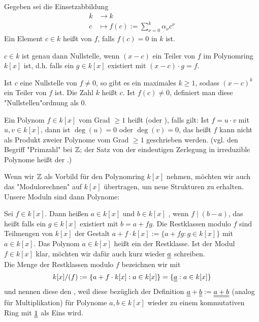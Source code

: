 \begin{defn}[Nullstelle]
	Gegeben sei die Einsetzabbildung
	\begin{equation}
	\begin{aligned}
		k &\longrightarrow k \\
		c &\longmapsto f(c) := \sum_{\nu = 0}^{k} \alpha_\nu c^\nu
	\end{aligned}
	\end{equation}
	Ein Element $c \in k$ heißt  von $f$, falls $f(c) = 0$ in $k$ ist.
\end{defn}

\begin{bem}
	$c \in k$ ist genau dann Nullstelle, wenn $(x-c)$ ein Teiler von $f$ im Polynomring $k[x]$ ist, d.h. falls ein $g \in k[x]$ existiert mit $(x-c) \cdot g = f$.
\end{bem}

\begin{defn}
	Ist $c$ eine Nullstelle von $f \neq 0$, so gibt es ein maximales $k \geq 1$, sodass $(x-c)^k$ ein Teiler von $f$ ist. Die Zahl $k$ heißt  $c$. Ist $f(c) \neq 0$, definiert man diese "Nullstellen"ordnung als $0$. 
\end{defn}

\begin{defn}
	Ein Polynom $f \in k[x]$ vom Grad $\geq 1$ heißt  (oder ), falls gilt: Ist $f = u \cdot v$ mit $u,v \in k[x]$, dann ist $\deg(u) = 0$ oder $\deg(v) = 0$, das heißt $f$ kann nicht als Produkt zweier Polynome vom Grad $\geq 1$ geschrieben werden. (vgl. den Begriff "Primzahl" bei $\mathbb{Z}$; der Satz von der eindeutigen Zerlegung in irreduzible Polynome heißt der .)
\end{defn}

Wenn wir $\mathbb{Z}$ als Vorbild für den Polynomring $k[x]$ nehmen, möchten wir auch das "Modulorechnen" auf $k[x]$ übertragen, um neue Strukturen zu erhalten. Unsere Moduln sind dann Polynome:
\begin{defn}
	Sei $f \in k[x]$. Dann heißen $a \in k[x]$ und $b \in k[x]$ , wenn $f \mid (b-a)$, das heißt falls ein $g \in k[x]$ existiert mit $b = a + fg$. Die Restklassen modulo $f$ sind Teilmengen von $k[x]$ der Gestalt $a + f \cdot k[x] := \{a + fg : g \in k[x]\}$ mit $a \in k[x]$. Das Polynom $a \in k[x]$ heißt ein  der Restklasse. Ist der Modul $f \in k[x]$ klar, möchten wir dafür auch kurz wieder $\uline{\uline{a}}$ schreiben. \\
	Die Menge der Restklassen modulo $f$ bezeichnen wir mit
	\[ k[x] / (f) := \{a + f\cdot k[x] : a \in k[x]\} = \{\uline{\uline{a}} : a \in k[x]\} \]
	und nennen diese den , weil diese bezüglich der Definition $\uline{\uline{a}} + \uline{\uline{b}} := \uline{\uline{a+b}}$ (analog für Multiplikation) für Polynome $a,b \in k[x]$ wieder zu einem kommutativen Ring mit $\uline{\uline{1}}$ als Eins wird. 
\end{defn}

